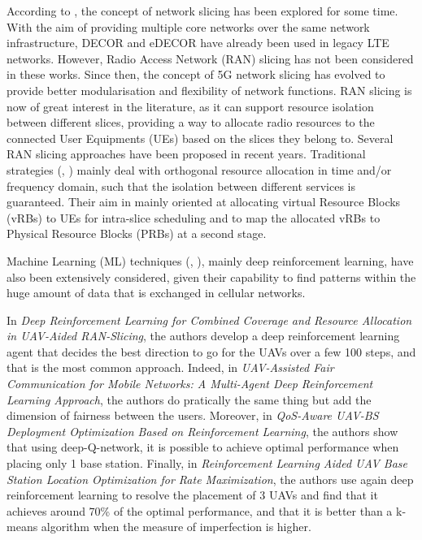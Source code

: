 \documentclass[letterpaper]{article}
\begin{document}
According to \cite{main_article}, the concept of network slicing has been explored for some time. With the aim of providing multiple core networks over the same network infrastructure, DECOR and eDECOR \cite{decor} have already been used in legacy LTE networks. 
However, Radio Access Network (RAN) slicing has not been considered in these works.
Since then, the concept of 5G network slicing has evolved to provide better modularisation and flexibility of network functions.
RAN slicing is now of great interest in the literature, as it can support resource isolation between different slices, providing a way to allocate radio resources to the connected User Equipments (UEs) based on the slices they belong to. 
Several RAN slicing approaches have been proposed in recent years. 
Traditional strategies (\hspace{1sp}\cite{RANslicing1}, \cite{orion})  mainly deal with orthogonal resource allocation in time and/or frequency domain, such that the isolation between different services is guaranteed. Their aim in mainly oriented at allocating virtual Resource Blocks (vRBs) to UEs for intra-slice scheduling and to map the allocated vRBs to Physical Resource Blocks (PRBs) at a second stage.

Machine Learning (ML) techniques (\hspace{1sp}\cite{fairness}, \cite{main_article}), mainly deep reinforcement learning, have also been extensively considered, given their capability to find patterns within the huge amount of data that is exchanged in cellular networks.

In \textit{Deep Reinforcement Learning for Combined Coverage and Resource Allocation in UAV-Aided RAN-Slicing}\cite{main_article}, the authors develop a deep reinforcement learning agent that decides the best direction to go for the UAVs over a few 100 steps, and that is the most common approach.
Indeed, in \textit{UAV-Assisted Fair Communication for Mobile Networks: A Multi-Agent Deep Reinforcement Learning Approach}\cite{fairness}, the authors do pratically the same thing but add the dimension of fairness between the users.
Moreover, in \textit{QoS-Aware UAV-BS Deployment Optimization Based on Reinforcement Learning}\cite{deep-qn}, the authors show that using deep-Q-network, it is possible to achieve optimal performance when placing only 1 base station.
Finally, in \textit{Reinforcement Learning Aided UAV Base Station Location Optimization for Rate Maximization}\cite{rate_max}, the authors use again deep reinforcement learning to resolve the placement of 3 UAVs and find that it achieves around 70\% of the optimal performance, and that it is better than a k-means algorithm when the measure of imperfection is higher.
\end{document}
